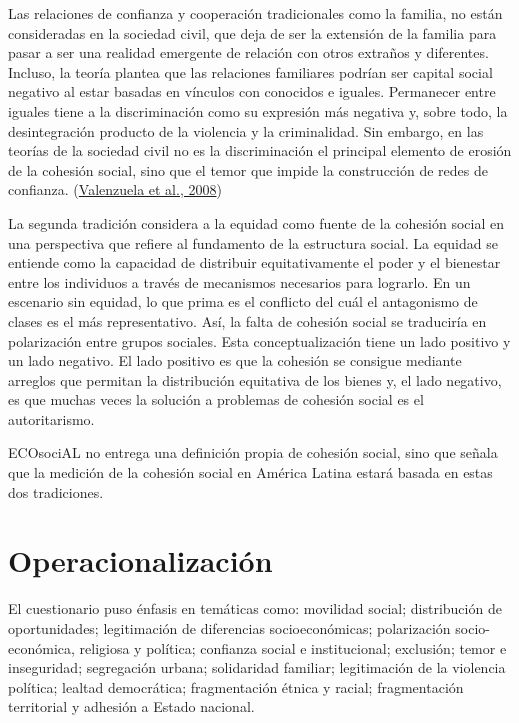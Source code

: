 \documentclass[
  12pt,
]{book}
\begin{document}
Las relaciones de confianza y cooperación tradicionales como la familia, no están consideradas en la sociedad civil, que deja de ser la extensión de la familia para pasar a ser una realidad emergente de relación con otros extraños y diferentes. Incluso, la teoría plantea que las relaciones familiares podrían ser capital social negativo al estar basadas en vínculos con conocidos e iguales. Permanecer entre iguales tiene a la discriminación como su expresión más negativa y, sobre todo, la desintegración producto de la violencia y la criminalidad. Sin embargo, en las teorías de la sociedad civil no es la discriminación el principal elemento de erosión de la cohesión social, sino que el temor que impide la construcción de redes de confianza. (\protect\hyperlink{ref-valenzuela_Vinculos_2008}{Valenzuela et al., 2008})

La segunda tradición considera a la equidad como fuente de la cohesión social en una perspectiva que refiere al fundamento de la estructura social. La equidad se entiende como la capacidad de distribuir equitativamente el poder y el bienestar entre los individuos a través de mecanismos necesarios para lograrlo. En un escenario sin equidad, lo que prima es el conflicto del cuál el antagonismo de clases es el más representativo. Así, la falta de cohesión social se traduciría en polarización entre grupos sociales. Esta conceptualización tiene un lado positivo y un lado negativo. El lado positivo es que la cohesión se consigue mediante arreglos que permitan la distribución equitativa de los bienes y, el lado negativo, es que muchas veces la solución a problemas de cohesión social es el autoritarismo.

ECOsociAL no entrega una definición propia de cohesión social, sino que señala que la medición de la cohesión social en América Latina estará basada en estas dos tradiciones.

\hypertarget{operacionalizaciuxf3n-4}{%
\section{Operacionalización}\label{operacionalizaciuxf3n-4}}

El cuestionario puso énfasis en temáticas como: movilidad social; distribución de oportunidades; legitimación de diferencias socioeconómicas; polarización socio-económica, religiosa y política; confianza social e institucional; exclusión; temor e inseguridad; segregación urbana; solidaridad familiar; legitimación de la violencia política; lealtad democrática; fragmentación étnica y racial; fragmentación territorial y adhesión a Estado nacional.
\end{document}
